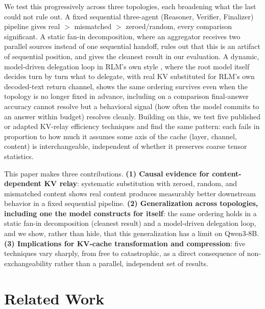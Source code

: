 \documentclass[11pt]{article}
\begin{document}
We test this progressively across three topologies, each broadening
what the last could not rule out. A fixed sequential three-agent
(Reasoner, Verifier, Finalizer) pipeline gives real $>$ mismatched $>$
zeroed/random, every comparison significant. A static fan-in
decomposition, where an aggregator receives two parallel sources
instead of one sequential handoff, rules out that this is an artifact
of sequential position, and gives the cleanest result in our
evaluation. A dynamic, model-driven delegation loop in RLM's own style
\citep{rlm2026}, where the root model itself decides turn by turn what
to delegate, with real KV substituted for RLM's own decoded-text return
channel, shows the same ordering survives even when the topology is no
longer fixed in advance, including on a comparison final-answer
accuracy cannot resolve but a behavioral signal (how often the model
commits to an answer within budget) resolves cleanly. Building on this,
we test five published or adapted KV-relay efficiency techniques and
find the same pattern: each fails in proportion to how much it assumes
some axis of the cache (layer, channel, content) is interchangeable,
independent of whether it preserves coarse tensor statistics.

This paper makes three contributions. \textbf{(1) Causal evidence for
content-dependent KV relay}: systematic substitution with zeroed,
random, and mismatched content shows real content produces measurably
better downstream behavior in a fixed sequential pipeline. \textbf{(2)
Generalization across topologies, including one the model constructs
for itself}: the same ordering holds in a static fan-in decomposition
(cleanest result) and a model-driven delegation loop, and we show,
rather than hide, that this generalization has a limit on Qwen3-8B.
\textbf{(3) Implications for KV-cache transformation and compression}:
five techniques vary sharply, from free to catastrophic, as a direct
consequence of non-exchangeability rather than a parallel, independent
set of results.

\section{Related Work}
\label{sec:related}
\end{document}
